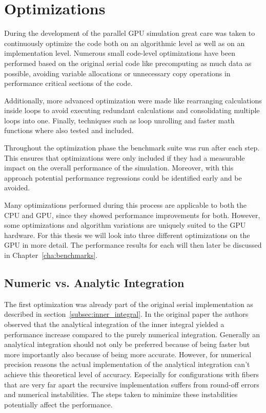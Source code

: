 \section{Optimizations}
\label{sec:parallel_optimizations}

During the development of the parallel GPU simulation great care was taken to continuously optimize the code both on an algorithmic level as well as on an implementation level. Numerous small code-level optimizations have been performed based on the original serial code like precomputing as much data as possible, avoiding variable allocations or unnecessary copy operations in performance critical sections of the code.

Additionally, more advanced optimization were made like rearranging calculations inside loops to avoid executing redundant calculations and consolidating multiple loops into one. Finally, techniques such as loop unrolling and faster math functions where also tested and included.

Throughout the optimization phase the benchmark suite was run after each step. This ensures that optimizations were only included if they had a measurable impact on the overall performance of the simulation. Moreover, with this approach potential performance regressions could be identified early and be avoided.

Many optimizations performed during this process are applicable to both the CPU and GPU, since they showed performance improvements for both. However, some optimizations and algorithm variations are uniquely suited to the GPU hardware. For this thesis we will look into three different optimizations on the GPU in more detail. The performance results for each will then later be discussed in Chapter~\ref{cha:benchmarks}.

\subsection{Numeric vs. Analytic Integration}
\label{subsec:numeric_analytic}
The first optimization was already part of the original serial implementation as described in section~\ref{subsec:inner_integral}. In the original paper \cite{Tornberg2006} the authors observed that the analytical integration of the inner integral yielded a performance increase compared to the purely numerical integration. Generally an analytical integration should not only be preferred because of being faster but more importantly also because of being more accurate. However, for numerical precision reasons the actual implementation of the analytical integration can't achieve this theoretical level of accuracy. Especially for configurations with fibers that are very far apart the recursive implementation suffers from round-off errors and numerical instabilities. The steps taken to minimize these instabilities potentially affect the performance.


